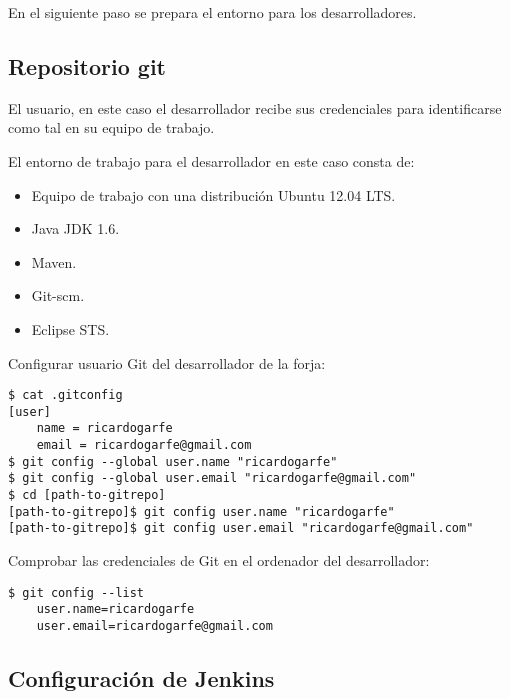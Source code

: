 \par En el siguiente paso se prepara el entorno para los desarrolladores.


\subsection{Repositorio git}
\label{sub:repo-git}

\par El usuario, en este caso el desarrollador recibe sus credenciales para identificarse como tal en su equipo de trabajo.

\par El entorno de trabajo para el desarrollador en este caso consta de:

\begin{itemize}
	\item Equipo de trabajo con una distribución Ubuntu 12.04 LTS.
	\item Java JDK 1.6.
	\item Maven.
	\item Git-scm.
	\item Eclipse STS.
\end{itemize}

\par Configurar usuario Git del desarrollador de la forja:

\lstset{style=bashbasico}
\begin{lstlisting}[frame=trbl]
$ cat .gitconfig 
[user]
    name = ricardogarfe
    email = ricardogarfe@gmail.com
$ git config --global user.name "ricardogarfe"
$ git config --global user.email "ricardogarfe@gmail.com"
$ cd [path-to-gitrepo]
[path-to-gitrepo]$ git config user.name "ricardogarfe"
[path-to-gitrepo]$ git config user.email "ricardogarfe@gmail.com"
\end{lstlisting}

\par Comprobar las credenciales de Git en el ordenador del desarrollador:

\lstset{style=bashbasico}
\begin{lstlisting}[frame=trbl]
$ git config --list
    user.name=ricardogarfe
    user.email=ricardogarfe@gmail.com
\end{lstlisting}


\subsection{Configuración de Jenkins}
\label{sub:jenkins-configuracion}

